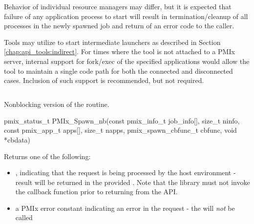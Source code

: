 \adviceuserstart
Behavior of individual resource managers may differ, but it is expected that failure of any application process to start will result in termination/cleanup of all processes in the newly spawned job and return of an error code to the caller.
\adviceuserend

\adviceimplstart
Tools may utilize  to start intermediate launchers as described in Section \ref{chap:api_tools:indirect}. For times where the tool is not attached to a \ac{PMIx} server, internal support for fork/exec of the specified applications would allow the tool to maintain a single code path for both the connected and disconnected cases. Inclusion of such support is recommended, but not required.
\adviceimplend


\subsection{}

\summary

Nonblocking version of the  routine.

\format

\cspecificstart
\begin{codepar}
pmix_status_t
PMIx_Spawn_nb(const pmix_info_t job_info[], size_t ninfo,
              const pmix_app_t apps[], size_t napps,
              pmix_spawn_cbfunc_t cbfunc, void *cbdata)
\end{codepar}
\cspecificend

\begin{arglist}
\end{arglist}

Returns one of the following:

\begin{itemize}
    \item {}, indicating that the request is being processed by the host environment - result will be returned in the provided . Note that the library must not invoke the callback function prior to returning from the \ac{API}.
    \item a PMIx error constant indicating an error in the request - the  will \textit{not} be called
\end{itemize}


